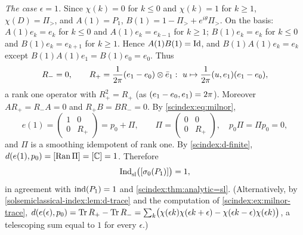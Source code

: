 \emph{The case $\epsilon=1$.} Since $\chi(k)=0$ for $k\le0$ and $\chi(k)=1$ for
$k\ge1$, $\chi(D)=\Pi_>$, and $A(1)=P_1$, $B(1)=1-\Pi_>+e^{i\theta}\Pi_>$. On the
basis: $A(1)e_k=e_k$ for $k\le0$ and $A(1)e_k=e_{k-1}$ for $k\ge1$; $B(1)e_k=e_k$ for
$k\le0$ and $B(1)e_k=e_{k+1}$ for $k\ge1$. Hence $A(1)B(1)=\operatorname{Id}$, and
$B(1)A(1)e_k=e_k$ except $B(1)A(1)e_1=B(1)e_0=e_0$. Thus
\begin{equation*}
  R_-=0,\qquad R_+=\frac1{2\pi}(e_1-e_0)\otimes\bar e_1:\ u\mapsto
  \frac1{2\pi}( u, e_1)(e_1-e_0),
\end{equation*}
a rank one operator with $R_+^2=R_+$ (as $( e_1-e_0, e_1)=2\pi$). Moreover
$AR_+=R_-A=0$ and $R_+B=BR_-=0$. By \eqref{scindex:eq:milnor},
\begin{equation*}
  e(1)=\begin{pmatrix}1&0\\0&R_+\end{pmatrix}=p_0+\Pi,\qquad
  \Pi=\begin{pmatrix}0&0\\0&R_+\end{pmatrix},\quad p_0\Pi=\Pi p_0=0,
\end{equation*}
and $\Pi$ is a smoothing idempotent of rank one. By \ref{scindex:d-finite},
$d(e(1),p_0)=[\operatorname{Ran}\Pi]=[\mathbb{C}]=1$. Therefore
\begin{equation*}
  \operatorname{Ind}^{}_{\mathrm{sl}}\bigl([\sigma_0(P_1)]\bigr)=1,
\end{equation*}
in agreement with $\operatorname{ind}(P_1)=1$ and \cref{scindex:thm:analytic=sl}. (Alternatively,
by \cref{solsemiclassical-index:lem:d-trace} and the computation of
\cref{scindex:ex:milnor-trace}, $d(e(\epsilon),p_0)=\operatorname{Tr} R_+-\operatorname{Tr} R_-=\sum_k
\bigl(\chi(\epsilon k)\chi(\epsilon k+\epsilon)-\chi(\epsilon k-\epsilon)\chi(\epsilon k)\bigr)$,
a telescoping sum equal to $1$ for every $\epsilon$.)
